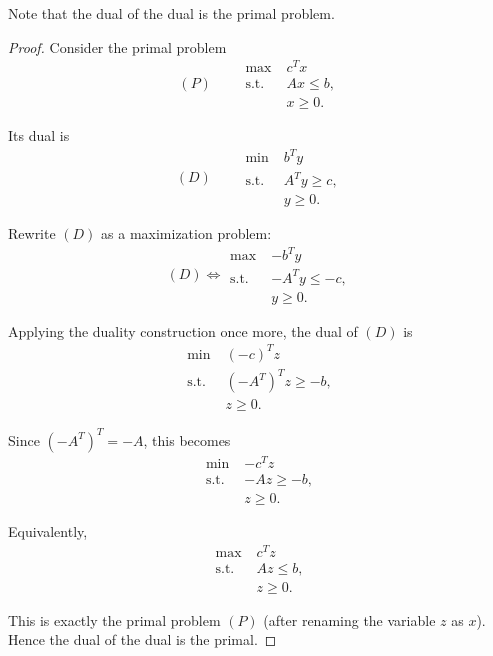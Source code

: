 \begin{remark}
    Note that the dual of the dual is the primal problem.
\end{remark}
\begin{proof}
Consider the primal problem
\[
(P)\qquad
\begin{aligned}
\max \;& c^T x\\
\text{s.t. }& Ax \le b,\\
& x \ge 0.
\end{aligned}
\]

Its dual is
\[
(D)\qquad
\begin{aligned}
\min \;& b^T y\\
\text{s.t. }& A^T y \ge c,\\
& y \ge 0.
\end{aligned}
\]

Rewrite $(D)$ as a maximization problem:
\[
(D)\iff
\begin{aligned}
\max\;& -b^T y\\
\text{s.t. }& -A^T y \le -c,\\
& y \ge 0.
\end{aligned}
\]

Applying the duality construction once more, the dual of $(D)$ is
\[
\begin{aligned}
\min\;& (-c)^T z\\
\text{s.t. }& (-A^T)^T z \ge -b,\\
& z \ge 0.
\end{aligned}
\]

Since $(-A^T)^T=-A$, this becomes
\[
\begin{aligned}
\min\;& -c^T z\\
\text{s.t. }& -Az \ge -b,\\
& z \ge 0.
\end{aligned}
\]

Equivalently,
\[
\begin{aligned}
\max\;& c^T z\\
\text{s.t. }& Az \le b,\\
& z \ge 0.
\end{aligned}
\]

This is exactly the primal problem $(P)$ (after renaming
the variable $z$ as $x$). Hence the dual of the dual is the primal.
\end{proof}


